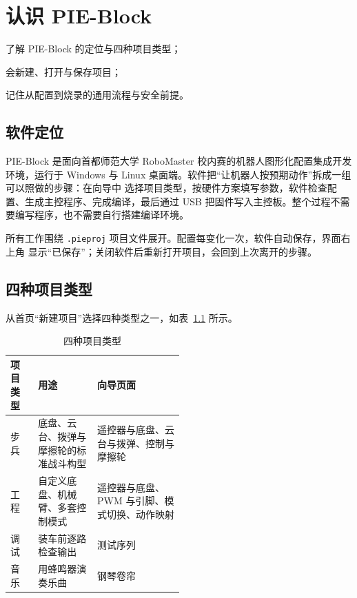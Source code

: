 \chapter{认识 PIE-Block}
\label{ch:concise-intro}

\begin{introduction}
  \item 了解 PIE-Block 的定位与四种项目类型；
  \item 会新建、打开与保存项目；
  \item 记住从配置到烧录的通用流程与安全前提。
\end{introduction}

\section{软件定位}

PIE-Block 是面向首都师范大学 RoboMaster 校内赛的机器人图形化配置集成开发环境，运行于
Windows 与 Linux 桌面端。软件把“让机器人按预期动作”拆成一组可以照做的步骤：在向导中
选择项目类型，按硬件方案填写参数，软件检查配置、生成主控程序、完成编译，最后通过 USB
把固件写入主控板。整个过程不需要编写程序，也不需要自行搭建编译环境。

所有工作围绕 \texttt{.pieproj} 项目文件展开。配置每变化一次，软件自动保存，界面右上角
显示“已保存”；关闭软件后重新打开项目，会回到上次离开的步骤。

\section{四种项目类型}

从首页“新建项目”选择四种类型之一，如表~\ref{tab:concise-kinds} 所示。

\begin{table}[htbp]
  \centering
  \small
  \begin{tabularx}{\linewidth}{@{}>{\raggedright\arraybackslash}p{0.16\linewidth}
      >{\raggedright\arraybackslash}p{0.34\linewidth}
      >{\raggedright\arraybackslash}X@{}}
    \toprule
    项目类型 & 用途 & 向导页面 \\
    \midrule
    步兵 & 底盘、云台、拨弹与摩擦轮的标准战斗构型 & 遥控器与底盘、云台与拨弹、控制与摩擦轮 \\
    工程 & 自定义底盘、机械臂、多套控制模式 & 遥控器与底盘、PWM 与引脚、模式切换、动作映射 \\
    调试 & 装车前逐路检查输出 & 测试序列 \\
    音乐 & 用蜂鸣器演奏乐曲 & 钢琴卷帘 \\
    \bottomrule
  \end{tabularx}
  \caption{四种项目类型}
  \label{tab:concise-kinds}
\end{table}

